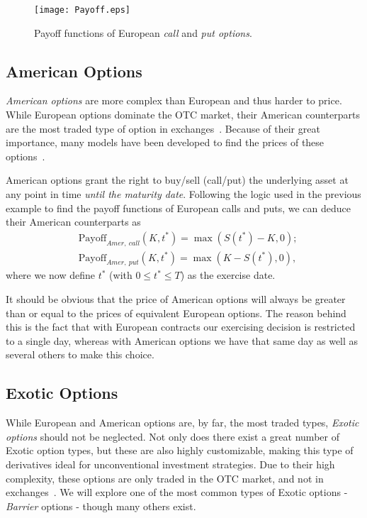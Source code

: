\begin{figure}[!htb]
    \centering
      \texttt{[image: Payoff.eps]}
      \caption[Payoff functions of European call and put options]{Payoff functions of European \emph{call} and \emph{put options}.}\label{fig:Payoff}
    \end{figure}
    



\subsection{American Options}
\emph{American options} are more complex than European and thus harder to price. While European options dominate the OTC market, their American counterparts are the most traded type of option in exchanges~\citep{InvAmer}. Because of their great importance, many models have been developed to find the prices of these options~\citep{Longstaff}.

American options grant the right to buy/sell (call/put) the underlying asset at any point in time \emph{until the maturity date}. Following the logic used in the previous example to find the payoff functions of European calls and puts, we can deduce their American counterparts as
\begin{equation}
\begin{split}
&\text{Payoff}_{Amer,\ call}(K,t^*)=\max\left(S(t^*)-K,0\right);\\
&\text{Payoff}_{Amer,\ put}(K,t^*)=\max\left(K-S(t^*),0\right),
\end{split}
\end{equation}
\noindent where we now define $t^*$ (with $0\leq t^*\leq T$) as the exercise date.

It should be obvious that the price of American options will always be greater than or equal to the prices of equivalent European options. The reason behind this is the fact that with European contracts our exercising decision is restricted to a single day, whereas with American options we have that same day as well as several others to make this choice.


\subsection{Exotic Options}
While European and American options are, by far, the most traded types, \emph{Exotic options} should not be neglected. Not only does there exist a great number of Exotic option types, but these are also highly customizable, making this type of derivatives ideal for unconventional investment strategies. Due to their high complexity, these options are only traded in the OTC market, and not in exchanges~\citep{InvExotic}. We will explore one of the most common types of Exotic options - \emph{Barrier} options - though many others exist.


